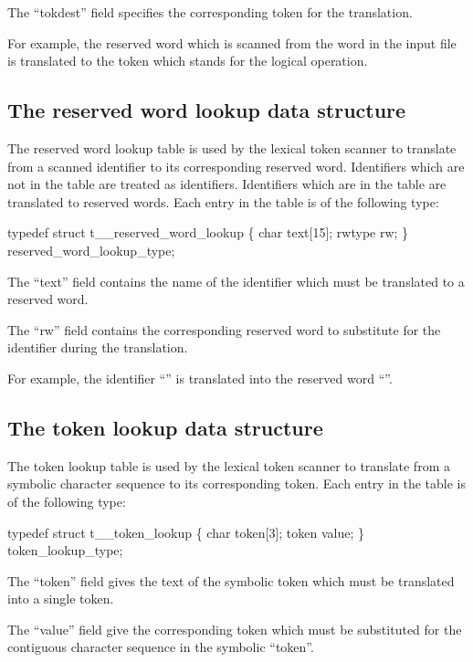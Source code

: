 The ``tokdest'' field specifies the corresponding token for the translation.

For example, the  reserved word which is scanned
from the word  in the input file is translated to
the token  which stands for the logical  operation.

\subsection{The reserved word lookup data structure}
\label{sec:rwlup}

The reserved word lookup table is used by the lexical token
scanner to translate from a scanned identifier to its corresponding
reserved word.   Identifiers which are not in the table are treated as
identifiers.   Identifiers which are in the table are translated to
reserved words.  Each entry in the table
is of the following type:
\begin{codeexample}
typedef struct t__reserved_word_lookup
   \{
      char text[15];
      rwtype rw;
   \} reserved_word_lookup_type;
\end{codeexample}


The ``text'' field contains the name of the identifier which must be
translated to a reserved word.

The ``rw'' field contains the corresponding reserved word to substitute
for the identifier during the translation.


For example, the identifier ``'' is translated into the 
reserved word ``''.

\subsection{The token lookup data structure}
\label{sec:tokenlup}

The token lookup table is used by the lexical token
scanner to translate from a symbolic character sequence
to its corresponding token.
Each entry in the table is of the following type:
\begin{codeexample}
typedef struct t__token_lookup
   \{
     char token[3];
     token value;
   \} token_lookup_type;
\end{codeexample}


The ``token'' field gives the text of the symbolic token which must be
translated into a single token.

The ``value'' field give the corresponding token which must be substituted
for the contiguous character sequence in the symbolic ``token''.

